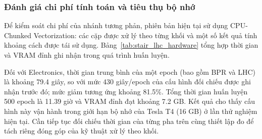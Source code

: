 \subsubsection{Đánh giá chi phí tính toán và tiêu thụ bộ nhớ}

Để kiểm soát chi phí của nhánh tương phản, phiên bản hiện tại sử dụng CPU-Chunked Vectorization: các cặp được xử lý theo từng khối và một số kết quả tính khoảng cách được tái sử dụng. Bảng~\ref{tab:stair_lhc_hardware} tổng hợp thời gian và VRAM đỉnh ghi nhận trong quá trình huấn luyện.

\begin{table}[htbp]
    \centering

    \caption{
        Mức tiêu thụ VRAM đỉnh và thời gian
        huấn luyện thực tế của STAIR-LHC v1.
    }
    \label{tab:stair_lhc_hardware}

    \small
    \renewcommand{\arraystretch}{1.15}
    \setlength{\tabcolsep}{5pt}

\end{table}

Đối với Electronics, thời gian trung bình của một epoch (bao gồm BPR và LHC) là khoảng 79.4 giây, so với mức 430 giây/epoch của cấu hình đối chiếu được ghi nhận trước đó; mức giảm tương ứng khoảng 81.5\%. Tổng thời gian huấn luyện 500 epoch là 11.39 giờ và VRAM đỉnh đạt khoảng 7.2 GB. Kết quả cho thấy cấu hình này vận hành trong giới hạn bộ nhớ của Tesla T4 (16 GB) ở lần thử nghiệm hiện tại. Cần tiếp tục đối chiếu thời gian của từng pha trên cùng thiết lập đo để tách riêng đóng góp của kỹ thuật xử lý theo khối.

